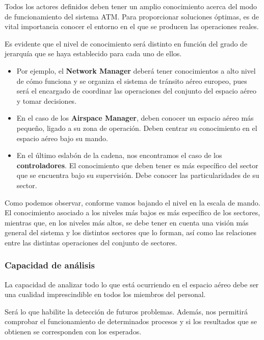 Todos los actores definidos deben tener un amplio conocimiento acerca del modo de funcionamiento del sistema ATM. Para proporcionar soluciones óptimas, es de vital importancia conocer el entorno en el que se producen las operaciones reales.

Es evidente que el nivel de conocimiento será distinto en función del grado de jerarquía que se haya establecido para cada uno de ellos. 

\begin{itemize}
    \item Por ejemplo, el \textbf{Network Manager} deberá tener conocimientos a alto nivel de cómo funciona y se organiza el sistema de tránsito aéreo europeo, pues será el encargado de coordinar las operaciones del conjunto del espacio aéreo y tomar decisiones.
    
    \item En el caso de los \textbf{Airspace Manager}, deben conocer un espacio aéreo más pequeño, ligado a su zona de operación. Deben centrar su conocimiento en el espacio aéreo bajo su mando.
    
    \item En el último eslabón de la cadena, nos encontramos el caso de los \textbf{controladores}. El conocimiento que deben tener es más específico del sector que se encuentra bajo su supervisión. Debe conocer las particularidades de su sector.
\end{itemize}

Como podemos observar, conforme vamos bajando el nivel en la escala de mando. El conocimiento asociado a los niveles más bajos es más específico de los sectores, mientras que, en los niveles más altos, se debe tener en cuenta una visión más general del sistema y los distintos sectores que lo forman, así como las relaciones entre las distintas operaciones del conjunto de sectores.

\subsubsection{Capacidad de análisis}

La capacidad de analizar todo lo que está ocurriendo en el espacio aéreo debe ser una cualidad imprescindible en todos los miembros del personal.

Será lo que habilite la detección de futuros problemas. Además, nos permitirá comprobar el funcionamiento de determinados procesos y si los resultados que se obtienen se corresponden con los esperados. 


